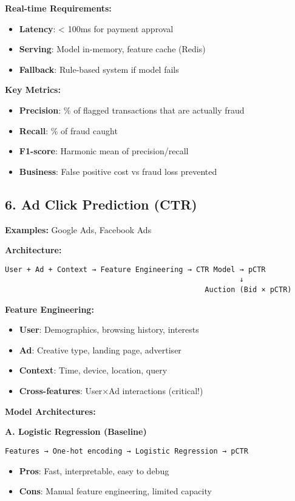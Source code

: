 \documentclass[8pt,landscape]{article}
\begin{document}
\begin{multicols}{3}
\textbf{Real-time Requirements:}
\begin{itemize}
\item \textbf{Latency}: < 100ms for payment approval
\item \textbf{Serving}: Model in-memory, feature cache (Redis)
\item \textbf{Fallback}: Rule-based system if model fails
\end{itemize}

\textbf{Key Metrics:}
\begin{itemize}
\item \textbf{Precision}: \% of flagged transactions that are actually fraud
\item \textbf{Recall}: \% of fraud caught
\item \textbf{F1-score}: Harmonic mean of precision/recall
\item \textbf{Business}: False positive cost vs fraud loss prevented
\end{itemize}

\subsection*{6. Ad Click Prediction (CTR)}
\textbf{Examples:} Google Ads, Facebook Ads

\textbf{Architecture:}
\begin{verbatim}
User + Ad + Context → Feature Engineering → CTR Model → pCTR
                                                      ↓
                                              Auction (Bid × pCTR)
\end{verbatim}

\textbf{Feature Engineering:}
\begin{itemize}
\item \textbf{User}: Demographics, browsing history, interests
\item \textbf{Ad}: Creative type, landing page, advertiser
\item \textbf{Context}: Time, device, location, query
\item \textbf{Cross-features}: User×Ad interactions (critical!)
\end{itemize}

\textbf{Model Architectures:}

\textbf{A. Logistic Regression (Baseline)}
\begin{verbatim}
Features → One-hot encoding → Logistic Regression → pCTR
\end{verbatim}
\begin{itemize}
\item \textbf{Pros}: Fast, interpretable, easy to debug
\item \textbf{Cons}: Manual feature engineering, limited capacity
\end{itemize}


\end{multicols}
\end{document}
